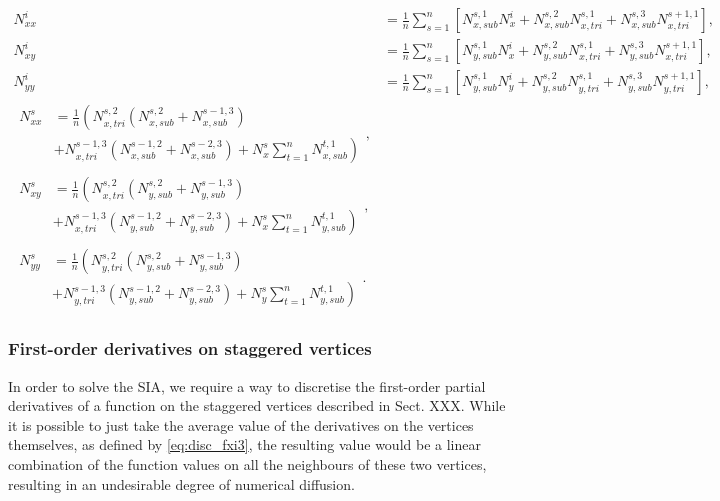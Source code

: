 \documentclass{article}
\begin{document}
\begin{align} \label{eq:disc_Nxxi2}
N_{xx}^i &= \frac{1}{n} \sum_{s=1}^n \left[ N_{x,sub}^{s,1} N_x^i + N_{x,sub}^{s,2} N_{x,tri}^{s,1} + N_{x,sub}^{s,3} N_{x,tri}^{s+1,1} \right], \\
N_{xy}^i &= \frac{1}{n} \sum_{s=1}^n \left[ N_{y,sub}^{s,1} N_x^i + N_{y,sub}^{s,2} N_{x,tri}^{s,1} + N_{y,sub}^{s,3} N_{x,tri}^{s+1,1} \right], \\
N_{yy}^i &= \frac{1}{n} \sum_{s=1}^n \left[ N_{y,sub}^{s,1} N_y^i + N_{y,sub}^{s,2} N_{y,tri}^{s,1} + N_{y,sub}^{s,3} N_{y,tri}^{s+1,1} \right], \\
\begin{split} N_{xx}^s &= \frac{1}{n} \left( N_{x,tri}^{s,2} \left( N_{x,sub}^{s,2} + N_{x,sub}^{s-1,3} \right) \right. \\
 & \left. + N_{x,tri}^{s-1,3} \left( N_{x,sub}^{s-1,2} + N_{x,sub}^{s-2,3} \right) + N_x^s \sum_{t=1}^n N_{x,sub}^{t,1} \right) \end{split}, \\
\begin{split} N_{xy}^s &= \frac{1}{n} \left( N_{x,tri}^{s,2} \left( N_{y,sub}^{s,2} + N_{y,sub}^{s-1,3} \right) \right. \\
 & \left. + N_{x,tri}^{s-1,3} \left( N_{y,sub}^{s-1,2} + N_{y,sub}^{s-2,3} \right) + N_x^s \sum_{t=1}^n N_{y,sub}^{t,1} \right) \end{split}, \\
\begin{split} N_{yy}^s &= \frac{1}{n} \left( N_{y,tri}^{s,2} \left( N_{y,sub}^{s,2} + N_{y,sub}^{s-1,3} \right) \right. \\
 & \left. + N_{y,tri}^{s-1,3} \left( N_{y,sub}^{s-1,2} + N_{y,sub}^{s-2,3} \right) + N_y^s \sum_{t=1}^n N_{y,sub}^{t,1} \right) \end{split}.
\end{align}

\subsubsection{First-order derivatives on staggered vertices}

In order to solve the SIA, we require a way to discretise the first-order partial derivatives of a function on the staggered vertices described in Sect. XXX. While it is possible to just take the average value of the derivatives on the vertices themselves, as defined by \eqref{eq:disc_fxi3}, the resulting value would be a linear combination of the function values on all the neighbours of these two vertices, resulting in an undesirable degree of numerical diffusion.
\end{document}
